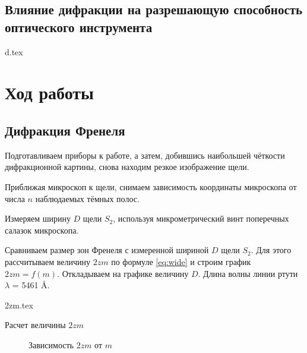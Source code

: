 \documentclass[a5paper,10pt, twoside]{article} %
\begin{document}
\subsection{Влияние дифракции на разрешающую способность оптического инструмента}
    {d.tex}

\section{Ход работы}

\subsection{Дифракция Френеля}

Подготавливаем приборы к работе, а затем, добившись наибольшей чёткости дифракционной картины, снова 
находим резкое изображение щели.

Приближая микроскоп к щели, снимаем зависимость координаты микроскопа от числа $n$ наблюдаемых тёмных 
полос.

Измеряем ширину $D$ щели $S_2$, используя микрометрический винт поперечных салазок микроскопа.

Сравниваем размер зон Френеля с измеренной шириной $D$ щели $S_2$. Для этого рассчитываем величину
$2 z m$ по формуле \eqref{eq:wide} и строим график $2 z m = f(m)$. Откладываем на графике величину $D$.
Длина волны линии ртути $\lambda$ = 5461 \AA.

\begin{table}
	\begin{center}
		{2zm.tex}
	\end{center}
	\caption{Расчет величины $2 z m$}
\end{table}

\begin{figure}[h]
	\caption{Зависимость $2 z m$ от $m$} 
\end{figure}
\end{document}
